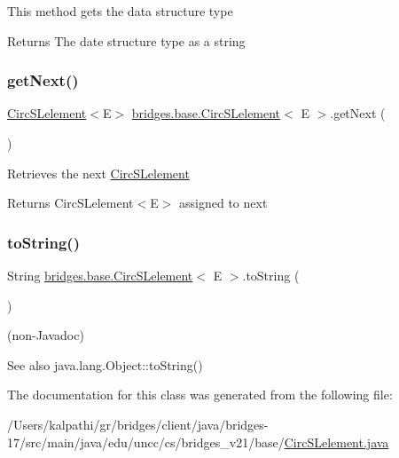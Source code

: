 This method gets the data structure type

\begin{DoxyReturn}{Returns}
The date structure type as a string 
\end{DoxyReturn}
\mbox{\label{classbridges_1_1base_1_1_circ_s_lelement_ae18b07e3f1d37b5eca0cae22efc0d395}} 
\subsubsection{\texorpdfstring{get\+Next()}{getNext()}}
{\footnotesize\ttfamily \mbox{\hyperlink{classbridges_1_1base_1_1_circ_s_lelement}{Circ\+S\+Lelement}}$<$E$>$ \mbox{\hyperlink{classbridges_1_1base_1_1_circ_s_lelement}{bridges.\+base.\+Circ\+S\+Lelement}}$<$ E $>$.get\+Next (\begin{DoxyParamCaption}{ }\end{DoxyParamCaption})}

Retrieves the next \mbox{\hyperlink{classbridges_1_1base_1_1_circ_s_lelement}{Circ\+S\+Lelement}}

\begin{DoxyReturn}{Returns}
Circ\+S\+Lelement$<$\+E$>$ assigned to next 
\end{DoxyReturn}
\mbox{\label{classbridges_1_1base_1_1_circ_s_lelement_af307188926766e73efb988f102ce9740}} 
\subsubsection{\texorpdfstring{to\+String()}{toString()}}
{\footnotesize\ttfamily String \mbox{\hyperlink{classbridges_1_1base_1_1_circ_s_lelement}{bridges.\+base.\+Circ\+S\+Lelement}}$<$ E $>$.to\+String (\begin{DoxyParamCaption}{ }\end{DoxyParamCaption})}

(non-\/\+Javadoc)

\begin{DoxySeeAlso}{See also}
java.\+lang.\+Object\+::to\+String() 
\end{DoxySeeAlso}


The documentation for this class was generated from the following file\+:\begin{DoxyCompactItemize}
\item 
/\+Users/kalpathi/gr/bridges/client/java/bridges-\/17/src/main/java/edu/uncc/cs/bridges\+\_\+v21/base/\mbox{\hyperlink{_circ_s_lelement_8java}{Circ\+S\+Lelement.\+java}}\end{DoxyCompactItemize}
